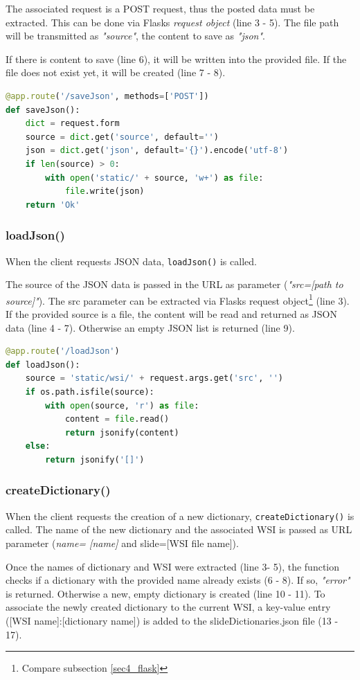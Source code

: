 The associated request is a POST request, thus the posted data must be extracted. This can be done via Flasks \emph{request object} (line 3 - 5). The file path will be transmitted as \emph{"source"}, the content to save as \emph{"json"}.

If there is content to save (line 6), it will be written into the provided file. If the file does not exist yet, it will be created (line 7 - 8).

\begin{lstlisting}[language=Python, frame=single]
@app.route('/saveJson', methods=['POST'])
def saveJson():
	dict = request.form
	source = dict.get('source', default='')
	json = dict.get('json', default='{}').encode('utf-8')
	if len(source) > 0:
		with open('static/' + source, 'w+') as file:
			file.write(json)
	return 'Ok'
\end{lstlisting}


\subsubsection{loadJson()}
When the client requests JSON data, \texttt{loadJson()} is called.

The source of the JSON data is passed in the URL as parameter (\emph{"src=[path to source]"}). The src parameter can be extracted via Flasks request object\footnote{
	Compare subsection \ref{sec4_flask}
} (line 3). If the provided source is a file, the content will be read and returned as JSON data (line 4 - 7). Otherwise an empty JSON list is returned (line 9).

\begin{lstlisting}[language=Python, frame=single]
@app.route('/loadJson')
def loadJson():
	source = 'static/wsi/' + request.args.get('src', '')
	if os.path.isfile(source):
		with open(source, 'r') as file:
			content = file.read()
			return jsonify(content)
	else:
		return jsonify('[]')
\end{lstlisting}


\subsubsection{createDictionary()}
When the client requests the creation of a new dictionary, \texttt{createDictionary()} is called. The name of the new dictionary and the associated WSI is passed as URL parameter (\emph{name= [name]} and slide=[WSI file name]). 

Once the names of dictionary and WSI were extracted (line 3- 5), the function checks if a dictionary with the provided name already exists (6 - 8). If so, \emph{"error"} is returned. Otherwise a new, empty dictionary is created (line 10 - 11). To associate the newly created dictionary to the current WSI, a key-value entry ([WSI name]:[dictionary name]) is added to the slideDictionaries.json file (13 - 17).

